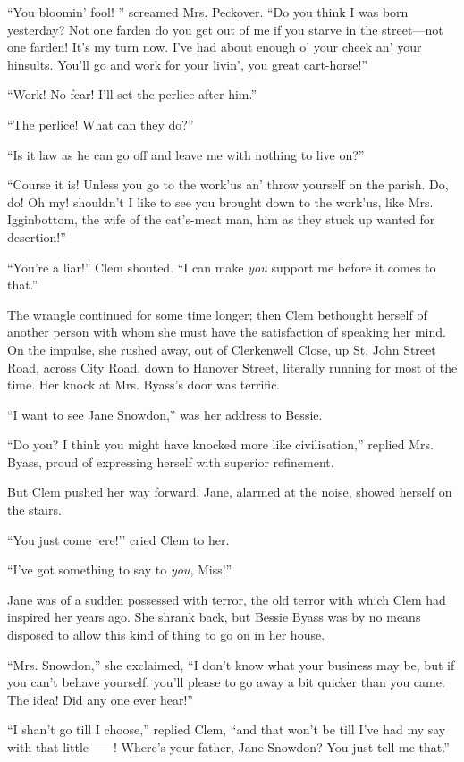 ``You bloomin' fool! '' screamed Mrs. Peckover. ``Do you think I was
born yesterday? Not one farden do you get out of me if you starve in the
street---not one farden! It's my turn now. I've had about enough o' your
cheek an' your hinsults. You'll go and work for your livin', you great
cart-horse!''

``Work! No fear! I'll set the perlice after him.''

``The perlice! What can they do?''

``Is it law as he can go off and leave me with nothing to live on?''

``Course it is! Unless you go to the work'us an' throw yourself on the
parish. Do, do! Oh my! shouldn't I like to see you brought down to the
work'us, like Mrs. Igginbottom, the wife of the cat's-meat man, him as
they stuck up wanted for desertion!''

``You're a liar!'' Clem shouted. ``I can make \emph{you} support me
before it comes to that.''

{\protect\hypertarget{244}{}{}}The wrangle continued for some time
longer; then Clem bethought herself of another person with whom she must
have the satisfaction of speaking her mind. On the impulse, she rushed
away, out of Clerkenwell Close, up St. John Street Road, across City
Road, down to Hanover Street, literally running for most of the time.
Her knock at Mrs. Byass's door was terrific.

``I want to see Jane Snowdon,'' was her address to Bessie.

``Do you? I think you might have knocked more like civilisation,''
replied Mrs. Byass, proud of expressing herself with superior
refinement.

But Clem pushed her way forward. Jane, alarmed at the noise, showed
herself on the stairs.

``You just come `ere!'' cried Clem to her.

``I've got something to say to \emph{you}, Miss!''

Jane was of a sudden possessed with terror, the old terror with which
Clem had inspired her years ago. She shrank back, but Bessie Byass was
by no means disposed to allow this kind of thing to go on in her house.

``Mrs. Snowdon,'' she exclaimed, ``I don't
{\protect\hypertarget{245}{}{}}know what your business may be, but if
you can't behave yourself, you'll please to go away a bit quicker than
you came. The idea! Did any one ever hear!''

``I shan't go till I choose,'' replied Clem, ``and that won't be till
I've had my say with that little{{------}}! Where's your father, Jane
Snowdon? You just tell me that.''

